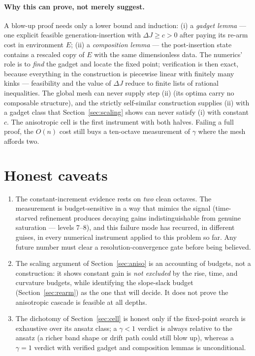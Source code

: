 \documentclass[11pt]{article}
\begin{document}
\paragraph{Why this can prove, not merely suggest.} A blow-up proof needs
only a lower bound and induction: (i) a \emph{gadget lemma} --- one
explicit feasible generation-insertion with $\Delta J\ge c>0$ after
paying its re-arm cost in environment $E$; (ii) a \emph{composition
lemma} --- the post-insertion state contains a rescaled copy of $E$ with
the same dimensionless data. The numerics' role is to \emph{find} the
gadget and locate the fixed point; verification is then exact, because
everything in the construction is piecewise linear with finitely many
kinks --- feasibility and the value of $\Delta J$ reduce to finite lists
of rational inequalities. The global mesh can never supply step (ii)
(its optima carry no composable structure), and the strictly
self-similar construction supplies (ii) with a gadget class that
Section~\ref{sec:scaling} shows can never satisfy (i) with constant $c$.
The anisotropic cell is the first instrument with both halves. Failing a
full proof, the $O(n)$ cost still buys a ten-octave measurement of
$\gamma$ where the mesh affords two.

\section{Honest caveats}

\begin{enumerate}
\item The constant-increment evidence rests on \emph{two} clean octaves.
The measurement is budget-sensitive in a way that mimics the signal
(time-starved refinement produces decaying gains indistinguishable from
genuine saturation --- levels 7--8), and this failure mode has recurred,
in different guises, in every numerical instrument applied to this
problem so far. Any future number must clear a resolution-convergence
gate before being believed.
\item The scaling argument of Section~\ref{sec:aniso} is an accounting of
budgets, not a construction: it shows constant gain is \emph{not excluded}
by the rise, time, and curvature budgets, while identifying the slope-slack
budget (Section~\ref{sec:rearm}) as the one that will decide. It does not
prove the anisotropic cascade is feasible at all depths.
\item The dichotomy of Section~\ref{sec:cell} is honest only if the
fixed-point search is exhaustive over its ansatz class; a $\gamma<1$
verdict is always relative to the ansatz (a richer band shape or drift
path could still blow up), whereas a $\gamma=1$ verdict with verified
gadget and composition lemmas is unconditional.
\end{enumerate}
\end{document}

